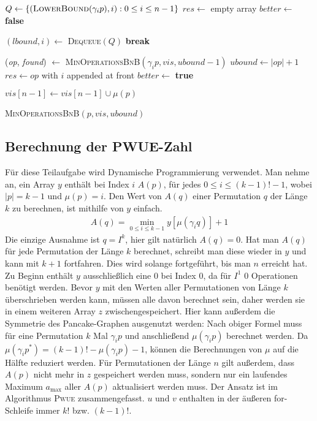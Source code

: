 \documentclass[a4paper, 10pt, ngerman]{article}
\begin{document}
\begin{algorithm}
    {
         \;
    }
    {
         \;
    }

    $Q \gets \{(\textsc{LowerBound}(\gamma_i p), i) : 0 \le i \le n - 1\}$ \;
    $res \gets$ empty array \;
    $better \gets$ \textbf{false} \;

    {
        $(lbound, i) \gets$ \textsc{Dequeue}$(Q)$ \;
        {
            \textbf{break} \;
        }

        (\emph{op}, \emph{found}) $\gets$ \textsc{MinOperationsBnB}$(\gamma_i p, vis, ubound - 1)$ \;
        {
            $ubound \gets |op| + 1$ \;
            $res \gets op$ with $i$ appended at front \;
            $better \gets$ \textbf{true} \;
        }
    }

    $vis[n - 1] \gets vis[n - 1] \cup \mu(p)$ \;
     \;

    \caption{\textsc{MinOperationsBnB}$(p, vis, ubound)$}
\end{algorithm}

\subsection{Berechnung der PWUE-Zahl}

Für diese Teilaufgabe wird Dynamische Programmierung verwendet. Man nehme an, ein Array $y$ enthält bei Index $i$ $A(p)$, für jedes $0 \le i \le (k - 1)! - 1$, wobei $|p| = k - 1$ und $\mu(p) = i$. Den Wert von $A(q)$ einer Permutation $q$ der Länge $k$ zu berechnen, ist mithilfe von $y$ einfach.
\begin{align*}
    A(q) = \min_{0 \le i \le k - 1}  y[\mu(\gamma_i q)] + 1
\end{align*}
Die einzige Ausnahme ist $q = I^k$, hier gilt natürlich $A(q) = 0$. Hat man $A(q)$ für jede Permutation der Länge $k$ berechnet, schreibt man diese wieder in $y$ und kann mit $k + 1$ fortfahren. Dies wird solange fortgeführt, bis man $n$ erreicht hat. Zu Beginn enthält $y$ ausschließlich eine 0 bei Index 0, da für $I^1$ 0 Operationen benötigt werden. Bevor $y$ mit den Werten aller Permutationen von Länge $k$ überschrieben werden kann, müssen alle davon berechnet sein, daher werden sie in einem weiteren Array $z$ zwischengespeichert. Hier kann außerdem die Symmetrie des Pancake-Graphen ausgenutzt werden: Nach obiger Formel muss für eine Permutation $k$ Mal $\gamma_i p$ und anschließend $\mu(\gamma_i p)$ berechnet werden. Da $\mu(\gamma_i p^*) = (k - 1)! - \mu(\gamma_i p) - 1$, können die Berechnungen von $\mu$ auf die Hälfte reduziert werden. Für Permutationen der Länge $n$ gilt außerdem, dass $A(p)$ nicht mehr in $z$ gespeichert werden muss, sondern nur ein laufendes Maximum $a_{\max}$ aller $A(p)$ aktualisiert werden muss. Der Ansatz ist im Algorithmus \textsc{Pwue} zusammengefasst. $u$ und $v$ enthalten in der äußeren for-Schleife immer $k!$ bzw. $(k - 1)!$.
\end{document}
